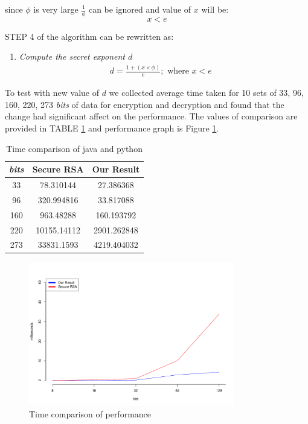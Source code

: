 \documentclass[12pt,journal,compsoc]{IEEEtran}
\begin{document}
since $\phi$ is very large $\frac{1}{\phi}$ can be ignored and value of $x$ will be:
\begin{equation}
	x < e
\end{equation}


STEP 4 of the algorithm can be rewritten as:

\begin{enumerate}[ {STEP }4{:} ]
\item \emph{Compute the secret exponent $d$}
	\begin{align}
		d = \frac{1 + (x \times \phi)}{e}; \text{ where } x < e&
	\end{align}
\end{enumerate}

To test with new value of $d$ we collected average time taken for 10 sets of 33, 96, 160, 220, 273 \emph{bits} of data for encryption and decryption and found that the change had significant affect on the performance. The values of comparison are provided in TABLE \ref{table:rsaVSjava} and performance graph is Figure \ref{fig:rsaVSjava}.

\begin{table}[ht]
	\begin{center}
	\begin{tabular}{|c|c|c|}
    	\hline
       		\emph{bits}	&		Secure RSA		&	Our Result\\
	\hline
    		33			&	78.310144	&	27.386368\\
		96			&	320.994816	&	33.817088\\
		160			&	963.48288	&	160.193792\\
		220			&	10155.14112	&	2901.262848\\
		273			&	33831.1593	&	4219.404032\\
	\hline
	\end{tabular}
	\end{center}
	\caption{Time comparison of java and python}
	\label{table:rsaVSjava}

\end{table}

\begin{figure}[ht!]
\centering
\includegraphics[width=90mm]{images/rsaVSjava.pdf}
\caption{Time comparison of performance}
\label{fig:rsaVSjava}
\end{figure}
\end{document}
